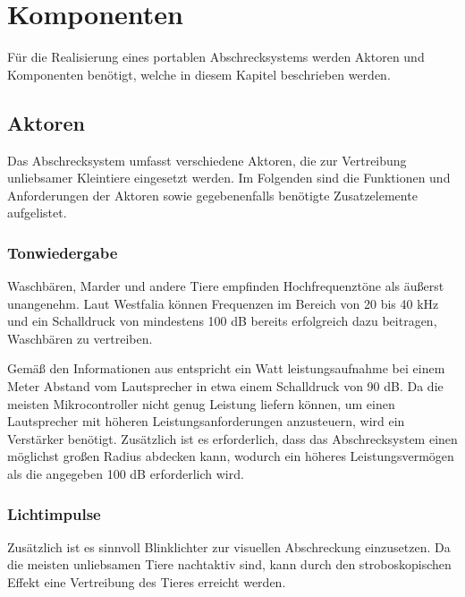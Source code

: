 
\section{Komponenten}

Für die Realisierung eines portablen Abschrecksystems werden Aktoren und Komponenten benötigt, welche in diesem Kapitel beschrieben werden.

\subsection{Aktoren}

Das Abschrecksystem umfasst verschiedene Aktoren, die zur Vertreibung unliebsamer Kleintiere eingesetzt werden. Im Folgenden sind die Funktionen und Anforderungen der Aktoren sowie gegebenenfalls benötigte Zusatzelemente aufgelistet.

\subsubsection{Tonwiedergabe}

Waschbären, Marder und andere Tiere empfinden Hochfrequenztöne als äußerst unangenehm. Laut Westfalia \cite{westfalia_wasch} können Frequenzen im Bereich von 20 bis 40 kHz und ein Schalldruck von mindestens 100 dB bereits erfolgreich dazu beitragen, Waschbären zu vertreiben.

Gemäß den Informationen aus \cite{sound_amplifier} entspricht ein Watt leistungsaufnahme bei einem Meter Abstand vom Lautsprecher in etwa einem Schalldruck von 90 dB. Da die meisten Mikrocontroller nicht genug Leistung liefern können, um einen Lautsprecher mit höheren Leistungsanforderungen anzusteuern, wird ein Verstärker benötigt. Zusätzlich ist es erforderlich, dass das Abschrecksystem einen möglichst großen Radius abdecken kann, wodurch ein höheres Leistungsvermögen als die angegeben 100 dB erforderlich wird.

\subsubsection{Lichtimpulse}

Zusätzlich ist es sinnvoll Blinklichter zur visuellen Abschreckung einzusetzen. Da die meisten unliebsamen Tiere nachtaktiv sind, kann durch den stroboskopischen Effekt eine Vertreibung des Tieres erreicht werden. \cite{anti_wasch}

